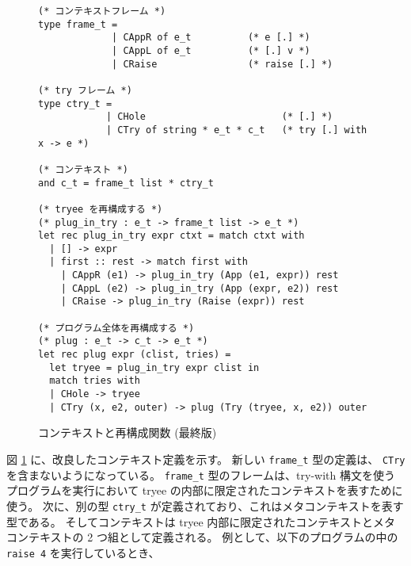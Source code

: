 \begin{figure}
\begin{spacing}{0.8}
\begin{verbatim}
(* コンテキストフレーム *)
type frame_t = 
             | CAppR of e_t          (* e [.] *)
             | CAppL of e_t          (* [.] v *)
             | CRaise                (* raise [.] *)

(* try フレーム *)
type ctry_t = 
            | CHole                        (* [.] *)
            | CTry of string * e_t * c_t   (* try [.] with x -> e *)

(* コンテキスト *)
and c_t = frame_t list * ctry_t

(* tryee を再構成する *)
(* plug_in_try : e_t -> frame_t list -> e_t *)
let rec plug_in_try expr ctxt = match ctxt with
  | [] -> expr
  | first :: rest -> match first with
    | CAppR (e1) -> plug_in_try (App (e1, expr)) rest
    | CAppL (e2) -> plug_in_try (App (expr, e2)) rest
    | CRaise -> plug_in_try (Raise (expr)) rest

(* プログラム全体を再構成する *)
(* plug : e_t -> c_t -> e_t *)
let rec plug expr (clist, tries) =
  let tryee = plug_in_try expr clist in
  match tries with
  | CHole -> tryee
  | CTry (x, e2, outer) -> plug (Try (tryee, x, e2)) outer
\end{verbatim}
\end{spacing}
  \caption{コンテキストと再構成関数 (最終版)}
  \label{figure:typec}
\end{figure}

図 \ref{figure:typec} に、改良したコンテキスト定義を示す。
新しい \texttt{frame\_t} 型の定義は、 \texttt{CTry} を含まないようになっている。
\texttt{frame\_t} 型のフレームは、try-with 構文を使うプログラムを実行において
tryee の内部に限定されたコンテキストを表すために使う。
次に、別の型 \texttt{ctry\_t} が定義されており、これはメタコンテキストを表す型である。
そしてコンテキストは tryee 内部に限定されたコンテキストとメタコンテキストの 2 つ組として定義される。
例として、以下のプログラムの中の \texttt{raise 4} を実行しているとき、

